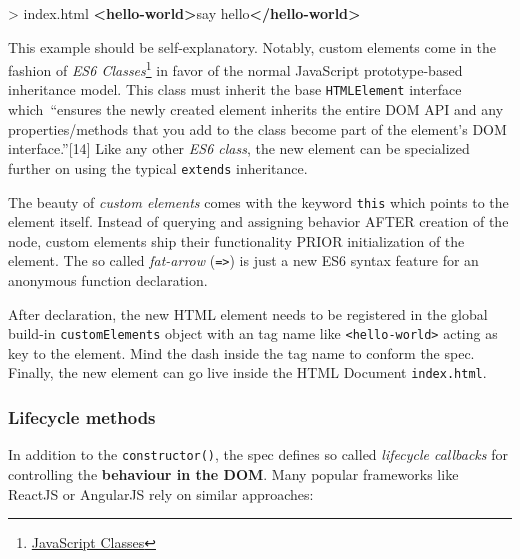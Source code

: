 \documentclass[]{article}
\newenvironment{Shaded}{}{}
\newcommand{\KeywordTok}[1]{\textcolor[rgb]{0.00,0.44,0.13}{\textbf{{#1}}}}
\newcommand{\NormalTok}[1]{{#1}}
\begin{document}
\begin{Shaded}
\begin{Highlighting}[]
\NormalTok{> index.html}
\KeywordTok{<hello-world>}\NormalTok{say hello}\KeywordTok{</hello-world>}
\end{Highlighting}
\end{Shaded}

This example should be self-explanatory. Notably, custom elements come
in the fashion of \emph{ES6 Classes}\footnote{\href{https://developer.mozilla.org/en/docs/Web/JavaScript/Reference/Classes}{JavaScript
  Classes}} in favor of the normal JavaScript prototype-based
inheritance model. This class must inherit the base \texttt{HTMLElement}
interface which~``ensures the newly created element inherits the entire
DOM API and any properties/methods that you add to the class become part
of the element's DOM interface.''{[}14{]} Like any other \emph{ES6
class}, the new element can be specialized further on using the typical
\texttt{extends} inheritance.

The beauty of \emph{custom elements} comes with the keyword
\texttt{this} which points to the element itself. Instead of querying
and assigning behavior AFTER creation of the node, custom elements ship
their functionality PRIOR initialization of the element. The so called
\emph{fat-arrow} (\texttt{=\textgreater{}}) is just a new ES6 syntax
feature for an anonymous function declaration.

After declaration, the new HTML element needs to be registered in the
global build-in \texttt{customElements} object with an tag name like
\texttt{\textless{}hello-world\textgreater{}} acting as key to the
element. Mind the dash inside the tag name to conform the spec. Finally,
the new element can go live inside the HTML Document
\texttt{index.html}.

\subsubsection{Lifecycle methods}\label{lifecycle-methods}

In addition to the \texttt{constructor()}, the spec defines so called
\emph{lifecycle callbacks} for controlling the \textbf{behaviour in the
DOM}. Many popular frameworks like ReactJS or AngularJS rely on similar
approaches:
\end{document}
